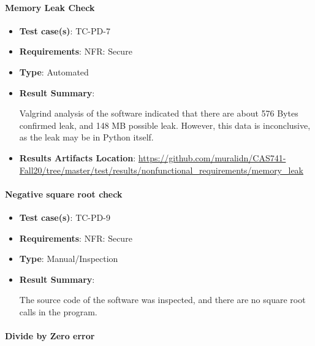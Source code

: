\documentclass[12pt, titlepage]{article}
\begin{document}
\paragraph{Memory Leak Check}

\begin{itemize}

\item \textbf{Test case(s)}: TC-PD-7

\item \textbf{Requirements}: NFR: Secure

\item \textbf{Type}: Automated

\item \textbf{Result Summary}: 

Valgrind analysis of the \progname{} software indicated
that there are about 576 Bytes confirmed leak, and 148 MB possible leak. However, this 
data is inconclusive, as the leak may be in Python itself.

\item \textbf{Results Artifacts Location}: \url{https://github.com/muralidn/CAS741-Fall20/tree/master/test/results/nonfunctional_requirements/memory_leak}

\end{itemize}

\paragraph{Negative square root check} 

\begin{itemize}

\item \textbf{Test case(s)}: TC-PD-9

\item \textbf{Requirements}: NFR: Secure

\item \textbf{Type}: Manual/Inspection

\item \textbf{Result Summary}: 

The source code of the \progname{} software was 
inspected, and there are no square root calls in the program.

\end{itemize}

\paragraph{Divide by Zero error} 
\end{document}
